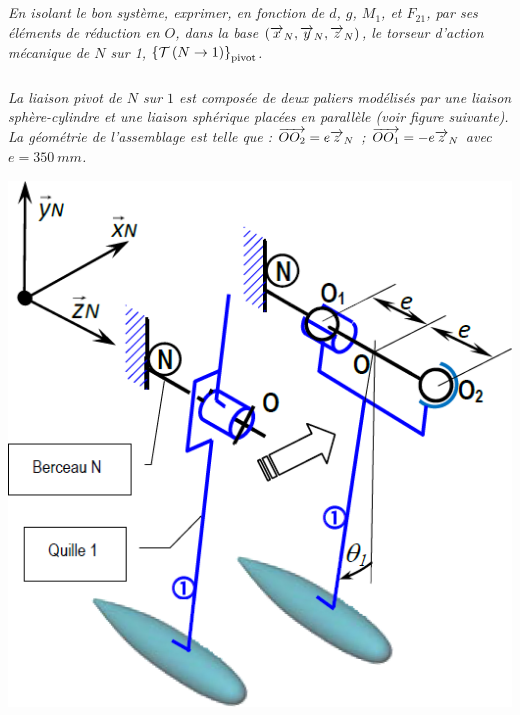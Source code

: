 \documentclass[10pt,fleqn]{article} %
\begin{document}
\begin{multicols}{2}
\begin{corrige}
\end{corrige}
\else
\fi

\subparagraph{}\textit{
En isolant le bon système, exprimer, en fonction de $d$, $g$,
$M_1$, et $F_{21}$, par ses éléments de réduction en $O$, dans la
base $\left( \overrightarrow{x}_N , \overrightarrow{y}_N , \overrightarrow{z}_N \right)$, le torseur d’action mécanique de $N$
sur 1, $\left\{\mathcal{T} \left(N\rightarrow 1 \right) \right\}_{\text{pivot}}$.}
\ifprof
\begin{corrige}
\end{corrige}
\else
\fi

\subparagraph{}\textit{
La liaison pivot de $N$ sur $1$ est composée de deux paliers modélisés par une liaison sphère-cylindre et une liaison sphérique placées en parallèle (voir figure suivante). La
géométrie de l’assemblage est telle que :
$\overrightarrow{OO_2}= e\overrightarrow{z}_N$ ; $\overrightarrow{OO_1}= -e\overrightarrow{z}_N$ avec $e=\SI{350}{mm}$.}
\ifprof
\begin{corrige}
\end{corrige}
\else
\fi




\begin{center}
\includegraphics[width=\linewidth]{images/fig_05}
\end{center}


\end{multicols}
\end{document}
